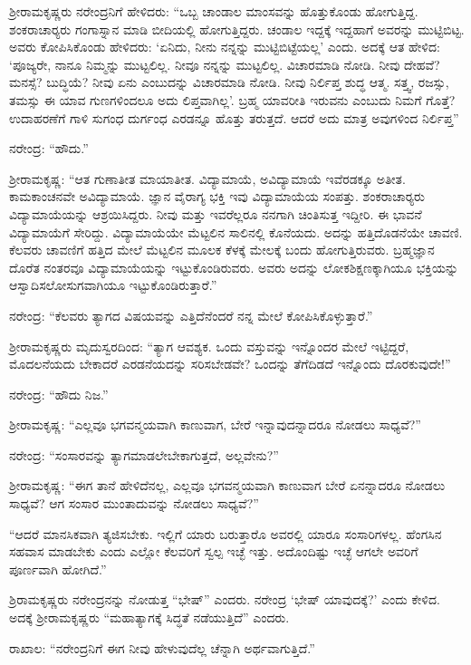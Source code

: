 ಶ‍್ರೀರಾಮಕೃಷ್ಣರು ನರೇಂದ್ರನಿಗೆ ಹೇಳಿದರು: “ಒಬ್ಬ ಚಾಂಡಾಲ ಮಾಂಸವನ್ನು ಹೊತ್ತುಕೊಂಡು ಹೋಗುತ್ತಿದ್ದ. ಶಂಕರಾಚಾರ‍್ಯರು ಗಂಗಾಸ್ನಾನ ಮಾಡಿ ಬೀದಿಯಲ್ಲಿ ಹೋಗುತ್ತಿದ್ದರು. ಚಂಡಾಲ ಇದ್ದಕ್ಕೆ ಇದ್ದಹಾಗೆ ಅವರನ್ನು ಮುಟ್ಟಿಬಿಟ್ಟ. ಅವರು ಕೋಪಿಸಿಕೊಂಡು ಹೇಳಿದರು: ‘ಏನಿದು, ನೀನು ನನ್ನನ್ನು ಮುಟ್ಟಿಬಿಟ್ಟೆಯಲ್ಲ’ ಎಂದು. ಅದಕ್ಕೆ ಆತ ಹೇಳಿದ: ‘ಪೂಜ್ಯರೇ, ನಾನೂ ನಿಮ್ಮನ್ನು ಮುಟ್ಟಲಿಲ್ಲ. ನೀವೂ ನನ್ನನ್ನು ಮುಟ್ಟಲಿಲ್ಲ. ವಿಚಾರಮಾಡಿ ನೋಡಿ. ನೀವು ದೇಹವೆ? ಮನಸ್ಸೆ? ಬುದ್ಧಿಯೆ? ನೀವು ಏನು ಎಂಬುದನ್ನು ವಿಚಾರಮಾಡಿ ನೋಡಿ. ನೀವು ನಿರ್ಲಿಪ್ತ ಶುದ್ಧ ಆತ್ಮ. ಸತ್ತ್ವ, ರಜಸ್ಸು, ತಮಸ್ಸು ಈ ಯಾವ ಗುಣಗಳಿಂದಲೂ ಅದು ಲಿಪ್ತವಾಗಿಲ್ಲ’. ಬ್ರಹ್ಮ ಯಾವರೀತಿ ಇರುವನು ಎಂಬುದು ನಿಮಗೆ ಗೊತ್ತೆ? ಉದಾಹರಣೆಗೆ ಗಾಳಿ ಸುಗಂಧ ದುರ್ಗಂಧ ಎರಡನ್ನೂ ಹೊತ್ತು ತರುತ್ತದೆ. ಆದರೆ ಅದು ಮಾತ್ರ ಅವುಗಳಿಂದ ನಿರ್ಲಿಪ್ತ”

ನರೇಂದ್ರ: “ಹೌದು.”

ಶ‍್ರೀರಾಮಕೃಷ್ಣ: “ಆತ ಗುಣಾತೀತ ಮಾಯಾತೀತ. ವಿದ್ಯಾಮಾಯೆ, ಅವಿದ್ಯಾಮಾಯೆ ಇವೆರಡಕ್ಕೂ ಅತೀತ. ಕಾಮಕಾಂಚನವೇ ಅವಿದ್ಯಾಮಾಯೆ. ಜ್ಞಾನ ವೈರಾಗ್ಯ ಭಕ್ತಿ ಇವು ವಿದ್ಯಾಮಾಯೆಯ ಸಂಪತ್ತು. ಶಂಕರಾಚಾರ‍್ಯರು ವಿದ್ಯಾಮಾಯೆಯನ್ನು ಆಶ್ರಯಿಸಿದ್ದರು. ನೀವು ಮತ್ತು ಇವರೆಲ್ಲರೂ ನನಗಾಗಿ ಚಿಂತಿಸುತ್ತ ಇದ್ದೀರಿ. ಈ ಭಾವನೆ ವಿದ್ಯಾಮಾಯೆಗೆ ಸೇರಿದ್ದು. ವಿದ್ಯಾಮಾಯೆಯೇ ಮೆಟ್ಟಲಿನ ಸಾಲಿನಲ್ಲಿ ಕೊನೆಯದು. ಅದನ್ನು ಹತ್ತಿದೊಡನೆಯೇ ಚಾವಣಿ. ಕೆಲವರು ಚಾವಣಿಗೆ ಹತ್ತಿದ ಮೇಲೆ ಮೆಟ್ಟಲಿನ ಮೂಲಕ ಕೆಳಕ್ಕೆ ಮೇಲಕ್ಕೆ ಬಂದು ಹೋಗುತ್ತಿರುವರು. ಬ್ರಹ್ಮಜ್ಞಾನ ದೊರೆತ ನಂತರವೂ ವಿದ್ಯಾಮಾಯೆಯನ್ನು ಇಟ್ಟುಕೊಂಡಿರುವರು. ಅವರು ಅದನ್ನು ಲೋಕಶಿಕ್ಷಣಕ್ಕಾಗಿಯೂ ಭಕ್ತಿಯನ್ನು ಆಸ್ವಾದಿಸಲೋಸುಗವಾಗಿಯೂ ಇಟ್ಟುಕೊಂಡಿರುತ್ತಾರೆ.”

ನರೇಂದ್ರ: “ಕೆಲವರು ತ್ಯಾಗದ ವಿಷಯವನ್ನು ಎತ್ತಿದೆನೆಂದರೆ ನನ್ನ ಮೇಲೆ ಕೋಪಿಸಿಕೊಳ್ಳುತ್ತಾರೆ.”

ಶ‍್ರೀರಾಮಕೃಷ್ಣರು ಮೃದುಸ್ವರದಿಂದ: “ತ್ಯಾಗ ಆವಶ್ಯಕ. ಒಂದು ವಸ್ತುವನ್ನು ಇನ್ನೊಂದರ ಮೇಲೆ ಇಟ್ಟಿದ್ದರೆ, ಮೊದಲನೆಯದು ಬೇಕಾದರೆ ಎರಡನೆಯದನ್ನು ಸರಿಸಬೇಡವೇ? ಒಂದನ್ನು ತೆಗೆದಿಡದೆ ಇನ್ನೊಂದು ದೊರಕುವುದೇ!”

ನರೇಂದ್ರ: “ಹೌದು ನಿಜ.”

ಶ‍್ರೀರಾಮಕೃಷ್ಣ: “ಎಲ್ಲವೂ ಭಗವನ್ಮಯವಾಗಿ ಕಾಣುವಾಗ, ಬೇರೆ ಇನ್ನಾವುದನ್ನಾದರೂ ನೋಡಲು ಸಾಧ್ಯವೆ?”

ನರೇಂದ್ರ: “ಸಂಸಾರವನ್ನು ತ್ಯಾಗಮಾಡಲೇಬೇಕಾಗುತ್ತದೆ, ಅಲ್ಲವೇನು?”

ಶ‍್ರೀರಾಮಕೃಷ್ಣ: “ಈಗ ತಾನೆ ಹೇಳಿದೆನಲ್ಲ, ಎಲ್ಲವೂ ಭಗವನ್ಮಯವಾಗಿ ಕಾಣುವಾಗ ಬೇರೆ ಏನನ್ನಾದರೂ ನೋಡಲು ಸಾಧ್ಯವೆ? ಆಗ ಸಂಸಾರ ಮುಂತಾದುವನ್ನು ನೋಡಲು ಸಾಧ್ಯವೆ?”

“ಆದರೆ ಮಾನಸಿಕವಾಗಿ ತ್ಯಜಿಸಬೇಕು. ಇಲ್ಲಿಗೆ ಯಾರು ಬರುತ್ತಾರೊ ಅವರಲ್ಲಿ ಯಾರೂ ಸಂಸಾರಿಗಳಲ್ಲ. ಹೆಂಗಸಿನ ಸಹವಾಸ ಮಾಡಬೇಕು ಎಂದು ಎಲ್ಲೋ ಕೆಲವರಿಗೆ ಸ್ವಲ್ಪ ಇಚ್ಛೆ ಇತ್ತು. ಅದೊಂದಿಷ್ಟು ಇಚ್ಛೆ ಆಗಲೇ ಅವರಿಗೆ ಪೂರ್ಣವಾಗಿ ಹೋಗಿದೆ.”

ಶ್ರಿರಾಮಕೃಷ್ಣರು ನರೇಂದ್ರನನ್ನು ನೋಡುತ್ತ “ಭೇಷ್” ಎಂದರು. ನರೇಂದ್ರ ‘ಭೇಷ್ ಯಾವುದಕ್ಕೆ?’ ಎಂದು ಕೇಳಿದ. ಅದಕ್ಕೆ ಶ‍್ರೀರಾಮಕೃಷ್ಣರು “ಮಹಾತ್ಯಾಗಕ್ಕೆ ಸಿದ್ಧತೆ ನಡೆಯುತ್ತಿದೆ” ಎಂದರು.

ರಾಖಾಲ: “ನರೇಂದ್ರನಿಗೆ ಈಗ ನೀವು ಹೇಳುವುದೆಲ್ಲ ಚೆನ್ನಾಗಿ ಅರ್ಥವಾಗುತ್ತಿದೆ.”

